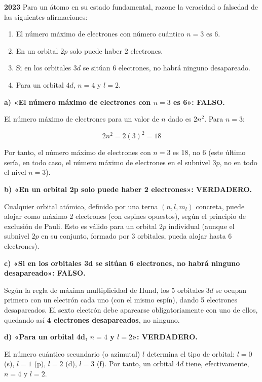 \begin{exerciseEVAU}
    \textbf{2023}
    Para un átomo en su estado fundamental, razone la veracidad o falsedad de las siguientes
    afirmaciones:
    \begin{enumerate}[label=\letraminuscula]
        \item El número máximo de electrones con número cuántico \( n = 3 \) es 6.
        \item En un orbital \( 2p \) solo puede haber 2 electrones.
        \item Si en los orbitales \( 3d \) se sitúan 6 electrones, no habrá ninguno desapareado.
        \item Para un orbital \( 4d \), \( n = 4 \) y \( l = 2 \).
    \end{enumerate}
    \begin{solu}

        \textbf{a) «El número máximo de electrones con \(n=3\) es 6»: FALSO.}

        El número máximo de electrones para un valor de \(n\) dado es \(2n^2\). Para \(n=3\):

        \begin{equation*}
            2n^2 = 2(3)^2 = 18
        \end{equation*}

        Por tanto, el número máximo de electrones con \(n=3\) es 18, no 6 (este último sería, en todo caso, el número máximo de electrones en el subnivel \(3p\), no en todo el nivel \(n=3\)).

        \textbf{b) «En un orbital 2p solo puede haber 2 electrones»: VERDADERO.}

        Cualquier orbital atómico, definido por una terna \((n,l,m_l)\) concreta, puede alojar como máximo 2 electrones (con espines opuestos), según el principio de exclusión de Pauli. Esto es válido para un orbital \(2p\) individual (aunque el subnivel \(2p\) en su conjunto, formado por 3 orbitales, pueda alojar hasta 6 electrones).

        \textbf{c) «Si en los orbitales 3d se sitúan 6 electrones, no habrá ninguno desapareado»: FALSO.}

        Según la regla de máxima multiplicidad de Hund, los 5 orbitales \(3d\) se ocupan primero con un electrón cada uno (con el mismo espín), dando 5 electrones desapareados. El sexto electrón debe aparearse obligatoriamente con uno de ellos, quedando así \textbf{4 electrones desapareados}, no ninguno.

        \textbf{d) «Para un orbital 4d, \(n=4\) y \(l=2\)»: VERDADERO.}

        El número cuántico secundario (o azimutal) \(l\) determina el tipo de orbital: \(l=0\) (s), \(l=1\) (p), \(l=2\) (d), \(l=3\) (f). Por tanto, un orbital \(4d\) tiene, efectivamente, \(n=4\) y \(l=2\).

    \end{solu}
\end{exerciseEVAU}


